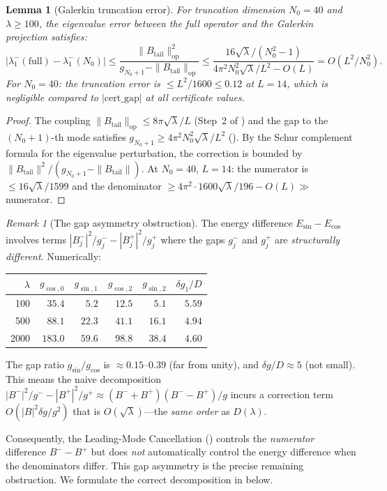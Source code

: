 \documentclass[12pt,a4paper]{article}
\newtheorem{lemma}[theorem]{Lemma}
\theoremstyle{definition}
\theoremstyle{remark}
\newtheorem{remark}[theorem]{Remark}
\begin{document}
\begin{lemma}[Galerkin truncation error]
\label{lem:galerkin-error}
For truncation dimension $N_0 = 40$ and $\lambda \geq 100$, the eigenvalue error between the full operator and the Galerkin projection satisfies:
\[
  |\lambda_1^-(\mathrm{full}) - \lambda_1^-(N_0)|
  \leq \frac{\|B_{\mathrm{tail}}\|_{\mathrm{op}}^2}{g_{N_0+1} - \|B_{\mathrm{tail}}\|_{\mathrm{op}}}
  \leq \frac{16\sqrt{\lambda}/(N_0^2-1)}{4\pi^2 N_0^2\sqrt{\lambda}/L^2 - O(L)}
  = O(L^2/N_0^2).
\]
For $N_0 = 40$: the truncation error is $\leq L^2/1600 \leq 0.12$ at $L = 14$, which is negligible compared to $|\mathrm{cert\_gap}|$ at all certificate values.
\end{lemma}
\begin{proof}
The coupling $\|B_{\mathrm{tail}}\|_{\mathrm{op}} \leq 8\pi\sqrt{\lambda}/L$ (Step~2 of ) and the gap to the $(N_0+1)$-th mode satisfies $g_{N_0+1} \geq 4\pi^2 N_0^2\sqrt{\lambda}/L^2$ (). By the Schur complement formula for the eigenvalue perturbation, the correction is bounded by $\|B_{\mathrm{tail}}\|^2/(g_{N_0+1} - \|B_{\mathrm{tail}}\|)$. At $N_0 = 40$, $L = 14$: the numerator is $\leq 16\sqrt{\lambda}/1599$ and the denominator $\geq 4\pi^2 \cdot 1600\sqrt{\lambda}/196 - O(L) \gg $ numerator.
\end{proof}

\begin{remark}[The gap asymmetry obstruction]
\label{rem:gap-asymmetry}
The energy difference $E_{\sin} - E_{\cos}$ involves terms $|B_j^-|^2/g_j^- - |B_j^+|^2/g_j^+$ where the gaps $g_j^-$ and $g_j^+$ are \emph{structurally different}. Numerically:

\begin{center}
\small
\renewcommand{\arraystretch}{1.15}
\begin{tabular}{r|rr|rr|r}
$\lambda$ & $g_{\cos,0}$ & $g_{\sin,1}$ & $g_{\cos,2}$ & $g_{\sin,2}$ & $\delta g_1/D$ \\\hline
100  & $35.4$ & $5.2$  & $12.5$ & $5.1$  & $5.59$ \\
500  & $88.1$ & $22.3$ & $41.1$ & $16.1$ & $4.94$ \\
2000 & $183.0$ & $59.6$ & $98.8$ & $38.4$ & $4.60$
\end{tabular}
\end{center}

\noindent The gap ratio $g_{\sin}/g_{\cos}$ is $\approx 0.15$--$0.39$ (far from unity), and $\delta g/D \approx 5$ (not small). This means the naive decomposition $|B^-|^2/g^- - |B^+|^2/g^+ \approx (B^- + B^+)(B^- - B^+)/g$ incurs a correction term $O(|B|^2 \delta g / g^2)$ that is $O(\sqrt{\lambda})$---the \emph{same order} as $D(\lambda)$.

Consequently, the Leading-Mode Cancellation () controls the \emph{numerator} difference $B^- - B^+$ but does \emph{not} automatically control the energy difference when the denominators differ. This gap asymmetry is the precise remaining obstruction. We formulate the correct decomposition in  below.
\end{remark}
\end{document}
